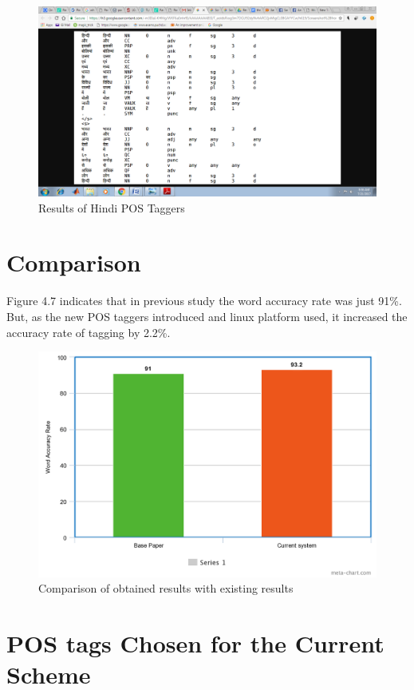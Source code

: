 \documentclass[12pt,a4paper,oneside]{memoir}
\begin{document}
\begin{figure}[h]
    \centering
    \includegraphics[scale=0.3]{jagjit4}
    \caption{Results of Hindi POS Taggers}
\end{figure}

\section{Comparison}
Figure 4.7 indicates that in previous study the word accuracy rate was just 91\%. But, as the new POS taggers introduced and linux platform used, it increased the accuracy rate of tagging by 2.2\%. 

\begin{figure}[h]
    \centering
    \includegraphics[scale=0.3]{jagjit5}
    \caption{Comparison of obtained results with existing results}
\end{figure}


\section{POS tags Chosen for the Current Scheme}
\end{document}
